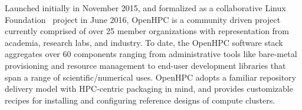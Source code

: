 Launched initially in November 2015, and formalized as a collaborative Linux
Foundation~\cite{LinuxFoundation_url} project in June 2016, OpenHPC is a
community driven project currently comprised of over 25 member organizations
with representation from academia, research labs, and industry. To date, the
OpenHPC software stack aggregates over 60 components ranging from
administrative tools like bare-metal provisioning and resource management to
end-user development libraries that span a range of scientific/numerical
uses. OpenHPC adopts a familiar repository delivery model with HPC-centric
packaging in mind, and provides customizable recipes for
installing and configuring reference designs of compute clusters.
